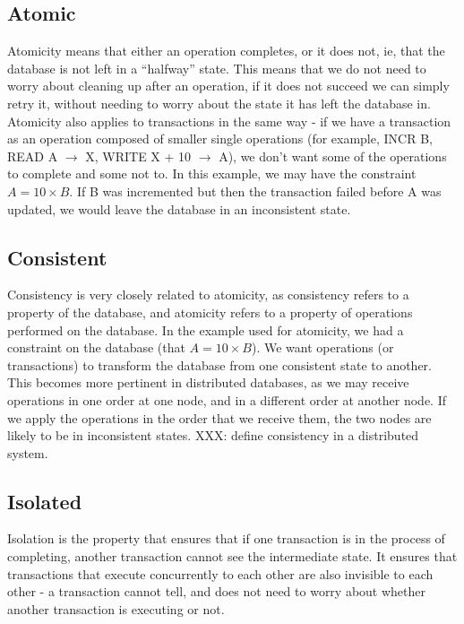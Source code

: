 \documentclass[12pt,twoside,notitlepage]{report}
\begin{document}
\subsection*{Atomic}

Atomicity means that either an operation completes, or it does not, ie, that the database is not
left in a ``halfway'' state. This means that we do not need to worry about cleaning up after an
operation, if it does not succeed we can simply retry it, without needing to worry about the state
it has left the database in. Atomicity also applies to transactions in the same way - if we have a
transaction as an operation composed of smaller single operations (for example, INCR B, READ A
$\rightarrow$ X, WRITE X + 10 $\rightarrow$ A), we don't want some of the operations to complete
and some not to. In this example, we may have the constraint $A = 10\times B$. If B was
incremented but then the transaction failed before A was updated, we would leave the database in
an inconsistent state.

\subsection*{Consistent}

Consistency is very closely related to atomicity, as consistency refers to a property of the
database, and atomicity refers to a property of operations performed on the database. In the
example used for atomicity, we had a constraint on the database (that $A = 10\times B$). We want
operations (or transactions) to transform the database from one consistent state to another. This
becomes more pertinent in distributed databases, as we may receive operations in one order at one
node, and in a different order at another node. If we apply the operations in the order that we
receive them, the two nodes are likely to be in inconsistent states. XXX: define consistency in a
distributed system.

\subsection*{Isolated}

Isolation is the property that ensures that if one transaction is in the process of completing,
another transaction cannot see the intermediate state. It ensures that transactions that execute
concurrently to each other are also invisible to each other - a transaction cannot tell, and does
not need to worry about whether another transaction is executing or not.
\end{document}
